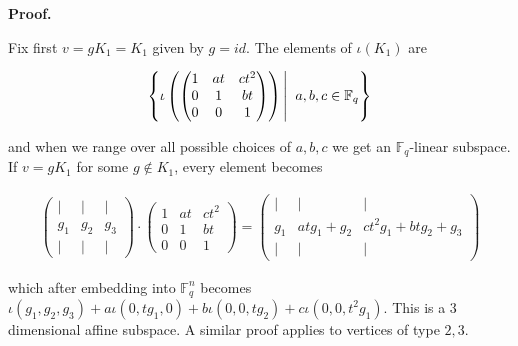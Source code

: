 


\par\medskip\noindent\textbf{Proof.}\par




Fix first $v=gK_{1}=K_{1}$ given by $g=id$. The elements of $\iota(K_{1})$ are\par


\[\begin{gathered}
\left\{\iota\left(\begin{pmatrix}1&at&ct^{2}\\
0&1&bt\\
0&0&1\end{pmatrix}\right)\left|\;\vphantom{\iota\left(\begin{pmatrix}1&at&ct^{2}\\
0&1&bt\\
0&0&1\end{pmatrix}\right)a,b,c\in\mathbb{F}_{q}}\right.a,b,c\in\mathbb{F}_{q}\right\}
\end{gathered}\]


and when we range over all possible choices of $a,b,c$ we get an $\mathbb{F}_{q}$-linear subspace. If $v=gK_{1}$ for some $g\not\in K_{1}$, every element becomes\par


\[\begin{gathered}
\begin{pmatrix}|&|&|\\
g_{1}&g_{2}&g_{3}\\
|&|&|\end{pmatrix}\cdot\begin{pmatrix}1&at&ct^{2}\\
0&1&bt\\
0&0&1\end{pmatrix}=\begin{pmatrix}|&|&|\\
g_{1}&atg_{1}+g_{2}&ct^{2}g_{1}+btg_{2}+g_{3}\\
|&|&|\end{pmatrix}
\end{gathered}\]


which after embedding into $\mathbb{F}_{q}^{n}$ becomes $\iota(g_{1},g_{2},g_{3})+a\iota(0,tg_{1},0)+b\iota(0,0,tg_{2})+c\iota(0,0,t^{2}g_{1})$. This is a $3$ dimensional affine subspace.
A similar proof applies to vertices of type $2,3$.\par




